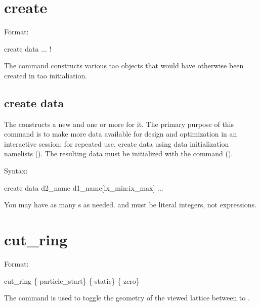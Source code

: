 \section{create}
\label{s:create}

Format:
\begin{example}
  create data ... ! 
\end{example}

The  command constructs various tao objects that would have
otherwise been created in tao initialiation. 



\subsection{create data}
\label{s:create.data}

The  constructs a new  and one or more  for it.
The primary purpose of this command is to make more data available for design
and optimization in an interactive session; for repeated use, create data using
data initialization namelists (). The resulting data must be
initialized with the  command ().

Syntax:
\begin{example}
  create data d2_name d1_name[ix_min:ix_max] ...
\end{example}

You may have as many s as needed.
 and  must be literal integers, not expressions.

\section{cut_ring}
\label{s:cut.ring}

Format:
\begin{example}
  cut_ring \{-particle_start\} \{-static\} \{-zero\} 
\end{example}

The  command is used to toggle the geometry of the viewed  lattice between
 to .


